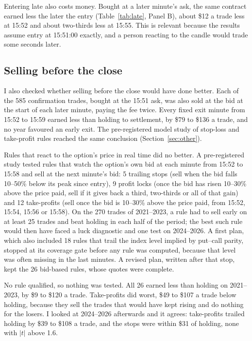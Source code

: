 \documentclass[12pt,letterpaper]{article}
\begin{document}
Entering late also costs money. Bought at a later minute's ask, the same
contract earned less the later the entry (Table~\ref{tab:late}, Panel B), about
\$12 a trade less at 15:52 and about two-thirds less at 15:55. This is relevant
because the results assume entry at 15:51:00 exactly, and a person reacting to
the candle would trade some seconds later.

\subsection{Selling before the close}
\label{sec:exits}

I also checked whether selling before the close would have done better. Each of
the 585 confirmation trades, bought
at the 15:51 ask, was also sold at the bid at the start of each later minute,
paying the fee twice. Every fixed exit minute from 15:52 to 15:59 earned less than
holding to settlement, by \$79 to \$136 a trade, and no year favoured an early
exit. The pre-registered model study of stop-loss and take-profit rules reached
the same conclusion (Section~\ref{sec:other}).

Rules that react to the option's price in real time did no better. A
pre-registered study tested rules that watch the option's own bid at each minute
from 15:52 to 15:58 and sell at the next minute's bid: 5 trailing stops (sell
when the bid falls 10--50\% below its peak since entry), 9 profit locks (once the
bid has risen 10--30\% above the price paid, sell if it gives back a third,
two-thirds or all of that gain) and 12 take-profits (sell once the bid is
10--30\% above the price paid, from 15:52, 15:54, 15:56 or 15:58). On the 270
trades of 2021--2023, a rule had to sell early on at least 25 trades and beat
holding in each half of the period; the best such rule would then have faced a
luck diagnostic and one test on 2024--2026. A first plan, which also included 18
rules that trail the index level implied by put--call parity, stopped at its
coverage gate before any rule was computed, because that level was often missing
in the last minutes. A revised plan, written after that stop, kept the 26
bid-based rules, whose quotes were complete.

No rule qualified, so nothing was tested. All 26 earned less than holding on
2021--2023, by \$9 to \$120 a trade. Take-profits did worst, \$49 to \$107 a
trade below holding, because they sell the trades that would have kept rising
and do nothing for the losers. I looked at 2024--2026 afterwards and it agrees:
take-profits trailed holding by \$39 to \$108 a trade, and the stops were within
\$31 of holding, none with $|t|$ above 1.6.
\end{document}

